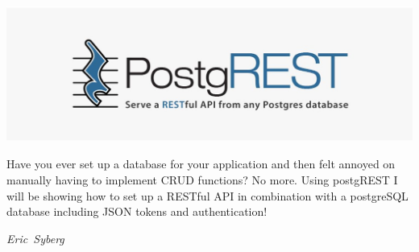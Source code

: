 \hfill\includegraphics[width=.5\linewidth]{images/postRESTlogo.png}

Have you ever set up a database for your application and then felt annoyed on manually having to implement CRUD functions?
No more. Using postgREST I will be showing how to set up a RESTful API in combination with a postgreSQL database including JSON tokens and authentication!

\hfill\textit{Eric~Syberg}
